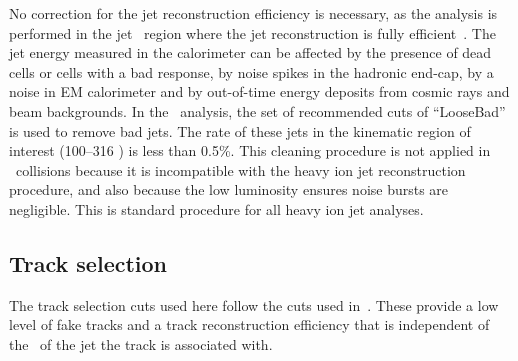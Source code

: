 No correction for the jet reconstruction efficiency is necessary, as the analysis is performed in the jet \pT\ region where the jet reconstruction is fully efficient~\cite{2015392}.
The jet energy measured in the calorimeter can be affected by the presence of dead cells or cells with a bad response, by noise spikes in the hadronic end-cap, by a noise in EM calorimeter and by out-of-time energy deposits from cosmic rays and beam backgrounds.
In the \pp\ analysis, the set of recommended cuts of ``LooseBad'' is used to remove bad jets.
The rate of these jets in the kinematic region of interest (100--316 \GeV) is less than 0.5\%.
This cleaning procedure is not applied in \PbPb\ collisions because it is incompatible with the heavy ion jet reconstruction procedure, and also because the low luminosity ensures noise bursts are negligible.
This is standard procedure for all heavy ion jet analyses.


\subsection{Track selection}
\label{sec:trackselection}

The track selection cuts used here follow the cuts used in~\cite{PhysRevC.98.024908}.
These provide a low level of fake tracks and a track reconstruction efficiency that is independent of the \pt\ of the jet the track is associated with.


